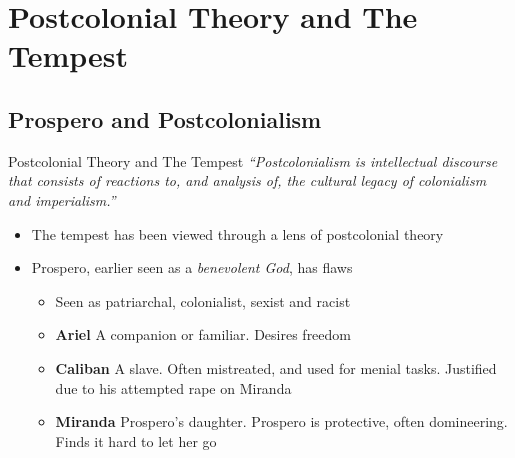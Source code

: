\documentclass{beamer}
\begin{document}
\section{Postcolonial Theory and The Tempest}
\subsection{Prospero and Postcolonialism}
\begin{frame}{Postcolonial Theory and The Tempest}
  \emph{``Postcolonialism is intellectual discourse that consists of reactions to, and analysis of, the cultural legacy of colonialism and imperialism.''}
  \begin{itemize}
    \item The tempest has been viewed through a lens of postcolonial theory
    \item Prospero, earlier seen as a \emph{benevolent God}, has flaws
      \begin{itemize}
      \item Seen as patriarchal, colonialist, sexist and racist
      \item \textbf{Ariel} A companion or familiar. Desires freedom
      \item \textbf{Caliban} A slave. Often mistreated, and used for menial tasks. Justified due to his attempted rape on Miranda
      \item \textbf{Miranda} Prospero's daughter. Prospero is protective, often domineering. Finds it hard to let her go
      \end{itemize}
  \end{itemize}
  \end{frame}
\end{document}

